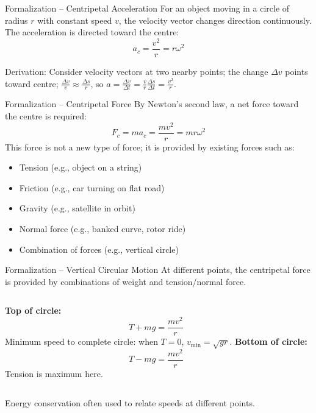 \documentclass[11pt]{beamer}
\begin{document}
\begin{frame}[shrink=10]{Formalization – Centripetal Acceleration}
For an object moving in a circle of radius $r$ with constant speed $v$, the velocity vector changes direction continuously. The acceleration is directed toward the centre:
\[ a_c = \frac{v^2}{r} = r\omega^2 \]
\begin{center}
\end{center}
Derivation: Consider velocity vectors at two nearby points; the change $\Delta v$ points toward centre; $\frac{\Delta v}{v} \approx \frac{\Delta s}{r}$, so $a = \frac{\Delta v}{\Delta t} = \frac{v}{r}\frac{\Delta s}{\Delta t} = \frac{v^2}{r}$.
\end{frame}

\begin{frame}{Formalization – Centripetal Force}
By Newton's second law, a net force toward the centre is required:
\[ F_c = ma_c = \frac{mv^2}{r} = mr\omega^2 \]
This force is not a new type of force; it is provided by existing forces such as:
\begin{itemize}
    \item Tension (e.g., object on a string)
    \item Friction (e.g., car turning on flat road)
    \item Gravity (e.g., satellite in orbit)
    \item Normal force (e.g., banked curve, rotor ride)
    \item Combination of forces (e.g., vertical circle)
\end{itemize}
\end{frame}

\begin{frame}{Formalization – Vertical Circular Motion}
At different points, the centripetal force is provided by combinations of weight and tension/normal force.
\vspace{0.3cm}
\begin{columns}[T]
\textbf{Top of circle:}
\[ T + mg = \frac{mv^2}{r} \]
Minimum speed to complete circle: when $T = 0$, $v_{\min} = \sqrt{gr}$.
\textbf{Bottom of circle:}
\[ T - mg = \frac{mv^2}{r} \]
Tension is maximum here.
\end{columns}
\vspace{0.3cm}
Energy conservation often used to relate speeds at different points.
\end{frame}
\end{document}

